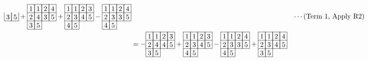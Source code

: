 \begin{align*}
\begin{array}[c]{*{4}c}
\lr{3}&\lr{5}\\\cline{1-2}
\end{array}
+\begin{array}[c]{*{4}c}\cline{1-4}
\lr{1}&\lr{1}&\lr{2}&\lr{4}\\\cline{1-4}
\lr{2}&\lr{4}&\lr{3}&\lr{5}\\\cline{1-4}
\lr{3}&\lr{5}\\\cline{1-2}
\end{array}
+\begin{array}[c]{*{4}c}\cline{1-4}
\lr{1}&\lr{1}&\lr{2}&\lr{3}\\\cline{1-4}
\lr{2}&\lr{3}&\lr{4}&\lr{5}\\\cline{1-4}
\lr{4}&\lr{5}\\\cline{1-2}
\end{array}
-\begin{array}[c]{*{4}c}\cline{1-4}
\lr{1}&\lr{1}&\lr{2}&\lr{4}\\\cline{1-4}
\lr{2}&\lr{3}&\lr{3}&\lr{5}\\\cline{1-4}
\lr{4}&\lr{5}\\\cline{1-2}
\end{array}
&&\cdots (\text{Term 1, Apply R2})
\\
&=
-\begin{array}[c]{*{4}c}\cline{1-4}
\lr{1}&\lr{1}&\lr{2}&\lr{3}\\\cline{1-4}
\lr{2}&\lr{4}&\lr{4}&\lr{5}\\\cline{1-4}
\lr{3}&\lr{5}\\\cline{1-2}
\end{array}
+\begin{array}[c]{*{4}c}\cline{1-4}
\lr{1}&\lr{1}&\lr{2}&\lr{3}\\\cline{1-4}
\lr{2}&\lr{3}&\lr{4}&\lr{5}\\\cline{1-4}
\lr{4}&\lr{5}\\\cline{1-2}
\end{array}
-\begin{array}[c]{*{4}c}\cline{1-4}
\lr{1}&\lr{1}&\lr{2}&\lr{4}\\\cline{1-4}
\lr{2}&\lr{3}&\lr{3}&\lr{5}\\\cline{1-4}
\lr{4}&\lr{5}\\\cline{1-2}
\end{array}
+\begin{array}[c]{*{4}c}\cline{1-4}
\lr{1}&\lr{1}&\lr{2}&\lr{4}\\\cline{1-4}
\lr{2}&\lr{3}&\lr{4}&\lr{5}\\\cline{1-4}
\lr{3}&\lr{5}\\\cline{1-2}

\end{array}
\end{align*}

